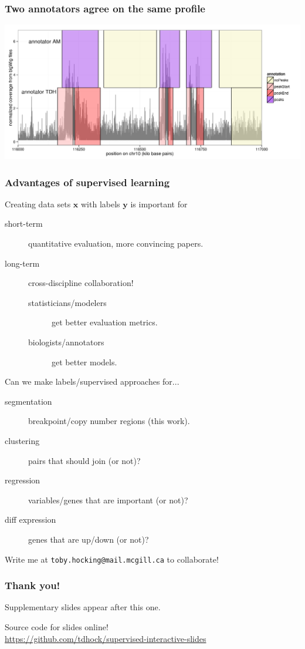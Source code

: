 \documentclass{beamer}
\begin{document}
\begin{frame}
  \frametitle{Two annotators agree on the same profile}
  
  \includegraphics[width=\textwidth]{figure-several-annotators}
\end{frame}

\begin{frame} 
  \frametitle{Advantages of supervised learning}
  Creating data sets $\mathbf x$ with labels $\mathbf y$ is important for
  \begin{description}
  \item[short-term] quantitative evaluation, more convincing papers.
  \item[long-term] cross-discipline collaboration!
    \begin{description}
    \item[statisticians/modelers] get better evaluation
    metrics.
    \item[biologists/annotators] get
    better models.
    \end{description}
  \end{description}

  Can we make labels/supervised approaches for...
  \begin{description}
  \item[segmentation] breakpoint/copy number regions (this work).
  \item[clustering] pairs that should join (or not)?
  \item[regression] variables/genes that are important (or not)?
  \item[diff expression] genes that are up/down (or not)?
  \end{description}
  Write me at \texttt{toby.hocking@mail.mcgill.ca} to collaborate!
\end{frame}

\begin{frame}
  \frametitle{Thank you!}
  Supplementary slides appear after this one.

  \vskip 1cm

  Source code for slides online!\\
  \small
  \url{https://github.com/tdhock/supervised-interactive-slides}
\end{frame}
\end{document}
